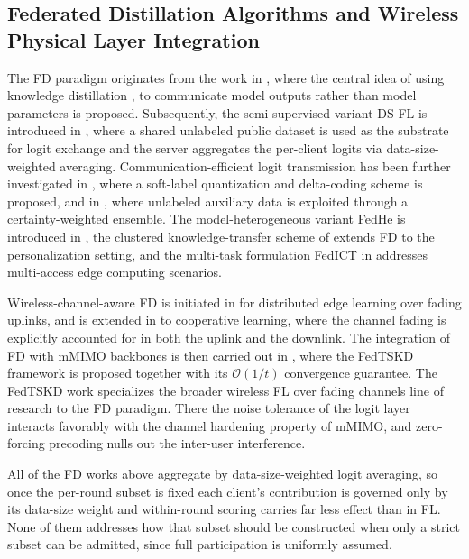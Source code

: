 \documentclass[journal]{IEEEtran}
\begin{document}
\subsection{Federated Distillation Algorithms and Wireless Physical Layer Integration}
\label{ssec:rw-fd}

The FD paradigm originates from the work in \cite{jeong2018communication}, where the central idea of using knowledge distillation \cite{hinton2015distilling}, \cite{wang2022kd} to communicate model outputs rather than model parameters is proposed. Subsequently, the semi-supervised variant DS-FL is introduced in \cite{itahara2023distillation}, where a shared unlabeled public dataset is used as the substrate for logit exchange and the server aggregates the per-client logits via data-size-weighted averaging. Communication-efficient logit transmission has been further investigated in \cite{sattler2022cfd}, where a soft-label quantization and delta-coding scheme is proposed, and in \cite{sattler2023fedaux}, where unlabeled auxiliary data is exploited through a certainty-weighted ensemble. The model-heterogeneous variant FedHe is introduced in \cite{chan2021fedhe}, the clustered knowledge-transfer scheme of \cite{cho2023clustered} extends FD to the personalization setting, and the multi-task formulation FedICT in \cite{wu2024fedict} addresses multi-access edge computing scenarios.

Wireless-channel-aware FD is initiated in \cite{ahn2019wireless} for distributed edge learning over fading uplinks, and is extended in \cite{ahn2020cooperative} to cooperative learning, where the channel fading is explicitly accounted for in both the uplink and the downlink. The integration of FD with mMIMO backbones is then carried out in \cite{mu2024fedtskd}, where the FedTSKD framework is proposed together with its $\mathcal{O}(1/t)$ convergence guarantee. The FedTSKD work specializes the broader wireless FL over fading channels line of research \cite{amiri2020federated, amiri2020machine, vu2020cell, amiri2021convergence} to the FD paradigm. There the noise tolerance of the logit layer interacts favorably with the channel hardening property of mMIMO, and zero-forcing precoding nulls out the inter-user interference.

All of the FD works above aggregate by data-size-weighted logit averaging, so once the per-round subset is fixed each client's contribution is governed only by its data-size weight and within-round scoring carries far less effect than in FL. None of them addresses how that subset should be constructed when only a strict subset can be admitted, since full participation is uniformly assumed.
\end{document}
